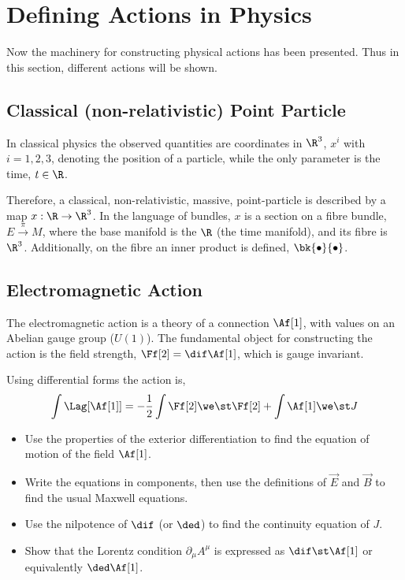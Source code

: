 \section{Defining Actions in Physics}

Now the machinery for constructing physical actions has been presented. Thus in this section, different actions will be shown.


\subsection{Classical (non-relativistic) Point Particle}

In classical physics the observed quantities are coordinates in $\R^3$, $x^i$ with $i = 1, 2, 3$, denoting the position of a particle, while the only parameter is the time,  $t\in \R$.

Therefore, a classical, non-relativistic, massive, point-particle is described by a map \mbox{$x: \R \to \R^3$.} In the language of bundles, $x$ is a section on a fibre bundle, $E \xrightarrow{~\pi~} M$, where the base manifold is the $\R$ (the time manifold), and its fibre is $\R^3$. Additionally, on the fibre an inner product is defined, $\bk{\bullet}{\bullet}$.




\subsection{Electromagnetic Action}

The electromagnetic action is a theory of a connection $\Af[1]$, with values on an Abelian gauge group ($U(1)$). The fundamental object for constructing the action is the field strength, \mbox{$\Ff[2]=\dif\Af[1]$,} which is gauge invariant.

Using differential forms the action is,
\begin{equation}
  \int \Lag[\Af[1]] = -\frac{1}{2} \int \Ff[2]\we \st \Ff[2] + \int \Af[1]\we \st J
\end{equation}


\begin{Ebox}
  \begin{itemize}
  \item Use the properties of the exterior differentiation to find the equation of motion of the field $\Af[1]$.
  \item Write the equations in components, then use the definitions of $\vec{E}$ and $\vec{B}$ to find the usual Maxwell equations.
  \item Use the nilpotence of $\dif$ (or $\ded$) to find the continuity equation of $J$.
  \item Show that the Lorentz condition $\partial_\mu A^\mu$ is expressed as $\dif \st \Af[1]$ or equivalently $\ded \Af[1]$.
  \end{itemize}
\end{Ebox}



